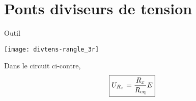 \documentclass[a4paper, 12pt, final, garamond]{book}
\begin{document}
\section{Ponts diviseurs de tension}
\begin{center}
    \begin{NCrapp}[sidebyside, halign=center, halign lower=center,
        width=\linewidth]{Outil}
        \begin{center}
            \texttt{[image: divtens-rangle\_3r]}
        \end{center}
        \tcblower
        \begin{center}
            Dans le circuit ci-contre,
            \[\boxed{U_{R_x} = \frac{R_x}{R_{\rm eq}}E}\]
        \end{center}
    \end{NCrapp}
\end{center}
\end{document}
